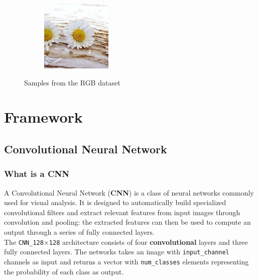 \documentclass{report}
\begin{document}
\begin{figure}[h!]
\begin{subfigure}[t]{0.19\textwidth}
    \label{fig:dataset-sub4}
  \end{subfigure}
  \hfill
  \begin{subfigure}[t]{0.19\textwidth}
    \centering
    \includegraphics[width=\textwidth]{dataset/flower_4.jpg}
    \label{fig:dataset-sub5}
  \end{subfigure}

  \caption{Samples from the RGB dataset}
  \label{fig:dataset}
\end{figure}


\chapter{Framework}
\section{Convolutional Neural Network}
\subsection{What is a CNN}
A Convolutional Neural Network (\textbf{CNN}) is a class of neural networks commonly used for visual analysis. It is designed to automatically build specialized convolutional filters and extract relevant features from input images through convolution and pooling: the extracted features can then be used to compute an output through a series of fully connected layers. \\
The \texttt{CNN\_128$\times$128} architecture consists of four \textbf{convolutional} layers and three fully connected layers. The networks takes an image with \texttt{input\_channel} channels as input and returns a vector with \texttt{num\_classes} elements representing the probability of each class as output.
\end{document}
